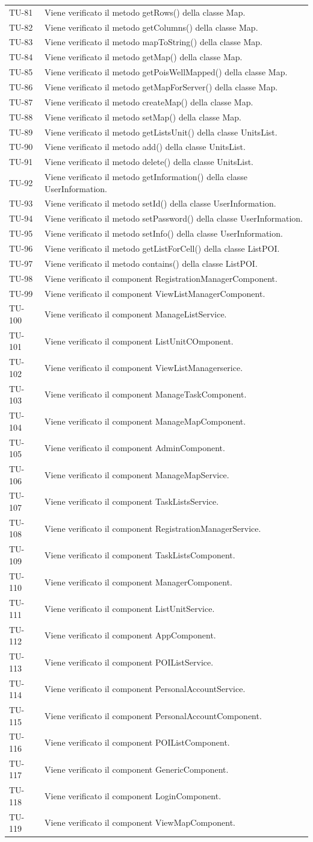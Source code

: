 \begin{longtable}{ >{\centering}p{} >{}p{}}
	TU-81 & Viene verificato il metodo getRows() della classe Map. \tabularnewline
	TU-82 & Viene verificato il metodo getColumns() della classe Map. \tabularnewline
	TU-83 & Viene verificato il metodo mapToString() della classe Map. \tabularnewline
	TU-84 & Viene verificato il metodo getMap() della classe Map. \tabularnewline
	TU-85 & Viene verificato il metodo getPoisWellMapped() della classe Map. \tabularnewline
	TU-86 & Viene verificato il metodo getMapForServer() della classe Map. \tabularnewline
	TU-87 & Viene verificato il metodo createMap() della classe Map. \tabularnewline
	TU-88 & Viene verificato il metodo setMap() della classe Map. \tabularnewline
	TU-89 & Viene verificato il metodo getListsUnit() della classe UnitsList. \tabularnewline
	TU-90 & Viene verificato il metodo add() della classe UnitsList. \tabularnewline
	TU-91 & Viene verificato il metodo delete() della classe UnitsList. \tabularnewline
	TU-92 & Viene verificato il metodo getInformation() della classe UserInformation. \tabularnewline
	TU-93 & Viene verificato il metodo setId() della classe UserInformation. \tabularnewline
	TU-94 & Viene verificato il metodo setPassword() della classe UserInformation. \tabularnewline
	TU-95 & Viene verificato il metodo setInfo() della classe UserInformation. \tabularnewline
	TU-96 & Viene verificato il metodo getListForCell() della classe ListPOI. \tabularnewline
	TU-97 & Viene verificato il metodo contains() della classe ListPOI. \tabularnewline
	TU-98 & Viene verificato il component RegistrationManagerComponent. \tabularnewline
	TU-99 & Viene verificato il component ViewListManagerComponent. \tabularnewline
	TU-100 & Viene verificato il component ManageListService. \tabularnewline
	TU-101 & Viene verificato il component ListUnitCOmponent. \tabularnewline
	TU-102 & Viene verificato il component ViewListManagerserice. \tabularnewline
	TU-103 & Viene verificato il component ManageTaskComponent. \tabularnewline
	TU-104 & Viene verificato il component ManageMapComponent. \tabularnewline
	TU-105 & Viene verificato il component AdminComponent. \tabularnewline
	TU-106 & Viene verificato il component ManageMapService. \tabularnewline
	TU-107 & Viene verificato il component TaskListsService. \tabularnewline
	TU-108 & Viene verificato il component RegistrationManagerService. \tabularnewline
	TU-109 & Viene verificato il component TaskListsComponent. \tabularnewline
	TU-110 & Viene verificato il component ManagerComponent. \tabularnewline
	TU-111 & Viene verificato il component ListUnitService. \tabularnewline
	TU-112 & Viene verificato il component AppComponent. \tabularnewline
	TU-113 & Viene verificato il component POIListService. \tabularnewline
	TU-114 & Viene verificato il component PersonalAccountService. \tabularnewline
	TU-115 & Viene verificato il component PersonalAccountComponent. \tabularnewline
	TU-116 & Viene verificato il component POIListComponent. \tabularnewline
	TU-117 & Viene verificato il component GenericComponent. \tabularnewline
	TU-118 & Viene verificato il component LoginComponent. \tabularnewline
	TU-119 & Viene verificato il component ViewMapComponent. \tabularnewline
	
\end{longtable}
